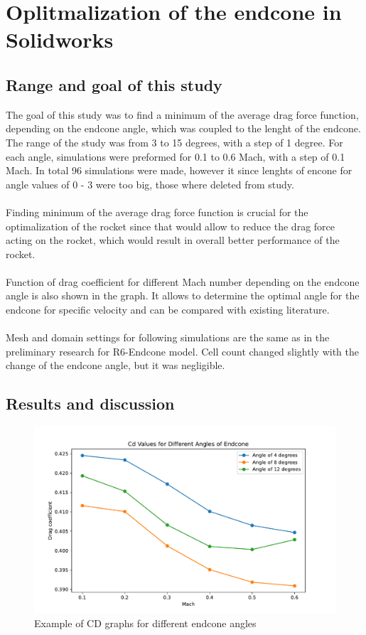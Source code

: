 \documentclass{article}
\begin{document}
\section{Oplitmalization of the endcone in Solidworks}
\subsection{Range and goal of this study}
The goal of this study was to find a minimum of the average drag force function, depending on
the endcone angle, which was coupled to the lenght of the endcone. The range of the
study was from 3 to 15 degrees, with a step of 1 degree. For each angle, simulations were preformed for 
0.1 to 0.6 Mach, with a step of 0.1 Mach. In total 96 simulations were made, however it since 
lenghts of encone for angle values of 0 - 3 were too big, those where deleted from study.\\\\
Finding minimum of the average drag force function is crucial for the optimalization of the rocket
since that would allow to reduce the drag force acting on the rocket, which would result in
overall better performance of the rocket.\\\\
Function of drag coefficient for different Mach number depending on the endcone angle is also 
shown in the graph. It allows to determine the optimal angle for the endcone for specific
velocity and can be compared with existing literature.\\\\
Mesh and domain settings for following simulations are the same as in the preliminary research for
R6-Endcone model. Cell count changed slightly with the change of the endcone angle, but it was
negligible.

\subsection{Results and discussion}

\begin{figure}[H]
    \centering
    \includegraphics[width=\textwidth]{../data/R6-Parametric-Endcone/ExampleCdGraphs.pdf}
    \caption{Example of CD graphs for different endcone angles}
\end{figure}
\end{document}
